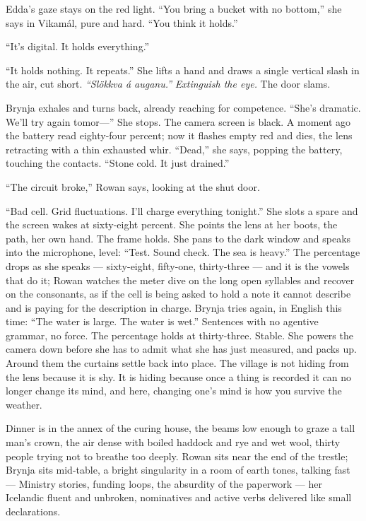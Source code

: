 \documentclass[11pt,oneside]{book}
\newcommand{\sceneline}{%
  \par\vspace{1.2em}
  \begin{center}
    \fontsize{11}{11}\selectfont \textbullet\quad\textbullet\quad\textbullet
  \end{center}
  \vspace{0.6em}\noindent\ignorespaces
}
\begin{document}
Edda's gaze stays on the red light. ``You bring a bucket with no
bottom,'' she says in Vikamál, pure and hard. ``You think it holds.''

``It's digital. It holds everything.''

``It holds nothing. It repeats.'' She lifts a hand and draws a single
vertical slash in the air, cut short. \emph{``Slökkva á auganu.''}
\emph{Extinguish the eye.} The door slams.

Brynja exhales and turns back, already reaching for competence. ``She's
dramatic. We'll try again tomor---'' She stops. The camera screen is
black. A moment ago the battery read eighty-four percent; now it flashes
empty red and dies, the lens retracting with a thin exhausted whir.
``Dead,'' she says, popping the battery, touching the contacts. ``Stone
cold. It just drained.''

``The circuit broke,'' Rowan says, looking at the shut door.

``Bad cell. Grid fluctuations. I'll charge everything tonight.'' She
slots a spare and the screen wakes at sixty-eight percent. She points
the lens at her boots, the path, her own hand. The frame holds. She pans
to the dark window and speaks into the microphone, level: ``Test. Sound
check. The sea is heavy.'' The percentage drops as she speaks ---
sixty-eight, fifty-one, thirty-three --- and it is the vowels that do
it; Rowan watches the meter dive on the long open syllables and recover
on the consonants, as if the cell is being asked to hold a note it
cannot describe and is paying for the description in charge. Brynja
tries again, in English this time: ``The water is large. The water is
wet.'' Sentences with no agentive grammar, no force. The percentage
holds at thirty-three. Stable. She powers the camera down before she has
to admit what she has just measured, and packs up. Around them the
curtains settle back into place. The village is not hiding from the lens
because it is shy. It is hiding because once a thing is recorded it can
no longer change its mind, and here, changing one's mind is how you
survive the weather.

\sceneline

Dinner is in the annex of the curing house, the beams low enough to
graze a tall man's crown, the air dense with boiled haddock and rye and
wet wool, thirty people trying not to breathe too deeply. Rowan sits
near the end of the trestle; Brynja sits mid-table, a bright singularity
in a room of earth tones, talking fast --- Ministry stories, funding
loops, the absurdity of the paperwork --- her Icelandic fluent and
unbroken, nominatives and active verbs delivered like small
declarations.
\end{document}
